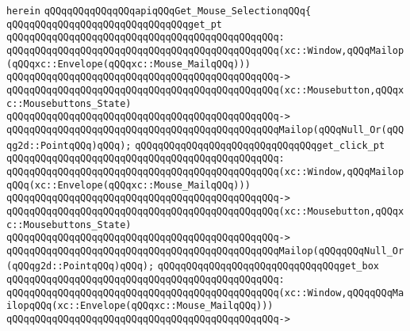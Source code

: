 \verb|herein|\newline
\newline
\verb|qQQqqQQqqQQqqQQqapiqQQqGet_Mouse_SelectionqQQq{|\newline
\newline
\newline
\verb|qQQqqQQqqQQqqQQqqQQqqQQqqQQqqQQqget_pt|\newline
\verb|qQQqqQQqqQQqqQQqqQQqqQQqqQQqqQQqqQQqqQQqqQQqqQQq:|\newline
\verb|qQQqqQQqqQQqqQQqqQQqqQQqqQQqqQQqqQQqqQQqqQQqqQQq(xc::Window,qQQqMailop(qQQqxc::Envelope(qQQqxc::Mouse_MailqQQq)))|\newline
\verb|qQQqqQQqqQQqqQQqqQQqqQQqqQQqqQQqqQQqqQQqqQQqqQQq->|\newline
\verb|qQQqqQQqqQQqqQQqqQQqqQQqqQQqqQQqqQQqqQQqqQQqqQQq(xc::Mousebutton,qQQqxc::Mousebuttons_State)|\newline
\verb|qQQqqQQqqQQqqQQqqQQqqQQqqQQqqQQqqQQqqQQqqQQqqQQq->|\newline
\verb|qQQqqQQqqQQqqQQqqQQqqQQqqQQqqQQqqQQqqQQqqQQqqQQqMailop(qQQqNull_Or(qQQqg2d::PointqQQq)qQQq);|\newline
\newline
\verb|qQQqqQQqqQQqqQQqqQQqqQQqqQQqqQQqget_click_pt|\newline
\verb|qQQqqQQqqQQqqQQqqQQqqQQqqQQqqQQqqQQqqQQqqQQqqQQq:|\newline
\verb|qQQqqQQqqQQqqQQqqQQqqQQqqQQqqQQqqQQqqQQqqQQqqQQq(xc::Window,qQQqMailopqQQq(xc::Envelope(qQQqxc::Mouse_MailqQQq)))|\newline
\verb|qQQqqQQqqQQqqQQqqQQqqQQqqQQqqQQqqQQqqQQqqQQqqQQq->|\newline
\verb|qQQqqQQqqQQqqQQqqQQqqQQqqQQqqQQqqQQqqQQqqQQqqQQq(xc::Mousebutton,qQQqxc::Mousebuttons_State)|\newline
\verb|qQQqqQQqqQQqqQQqqQQqqQQqqQQqqQQqqQQqqQQqqQQqqQQq->|\newline
\verb|qQQqqQQqqQQqqQQqqQQqqQQqqQQqqQQqqQQqqQQqqQQqqQQqMailop(qQQqqQQqNull_Or(qQQqg2d::PointqQQq)qQQq);|\newline
\newline
\verb|qQQqqQQqqQQqqQQqqQQqqQQqqQQqqQQqget_box|\newline
\verb|qQQqqQQqqQQqqQQqqQQqqQQqqQQqqQQqqQQqqQQqqQQqqQQq:|\newline
\verb|qQQqqQQqqQQqqQQqqQQqqQQqqQQqqQQqqQQqqQQqqQQqqQQq(xc::Window,qQQqqQQqMailopqQQq(xc::Envelope(qQQqxc::Mouse_MailqQQq)))|\newline
\verb|qQQqqQQqqQQqqQQqqQQqqQQqqQQqqQQqqQQqqQQqqQQqqQQq->|\newline
